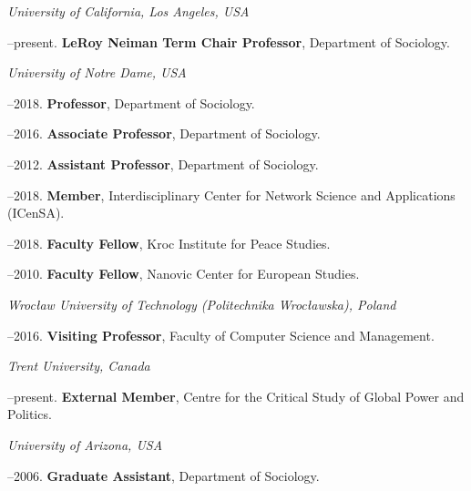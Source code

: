 \noindent\emph{University of California, Los Angeles, USA \vspace{0.01in}}

--present. {\bf LeRoy Neiman Term Chair Professor}, \newline Department of Sociology. 
\medskip

\noindent\emph{University of Notre Dame, USA \vspace{0.01in}}

--2018. {\bf Professor}, Department of Sociology.

--2016. {\bf Associate Professor}, Department of Sociology.

--2012. {\bf Assistant Professor}, Department of Sociology.

--2018. {\bf Member}, Interdisciplinary Center for Network Science and Applications (ICenSA).

--2018. {\bf Faculty Fellow}, Kroc Institute for Peace Studies.

--2010. {\bf Faculty Fellow}, Nanovic Center for European Studies.

\medskip
\noindent\emph{Wroc\l{}aw University of Technology (Politechnika Wroc\l{}awska), Poland \vspace{0.01in}}

--2016. {\bf Visiting Professor}, Faculty of Computer Science and Management.

\medskip

\noindent\emph{Trent University, Canada \vspace{0.01in}}

--present.  {\bf External Member}, Centre for the Critical Study of Global Power and Politics.
\medskip

\noindent\emph{University of Arizona, USA \vspace{0.01in}}

--2006.  {\bf Graduate Assistant}, Department of Sociology.